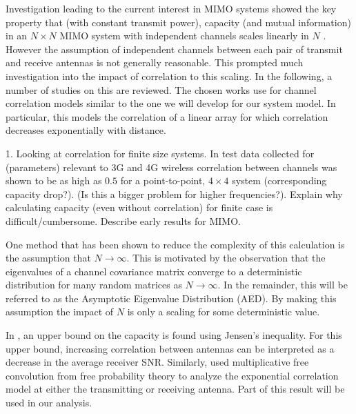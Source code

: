 \par
Investigation leading to the current interest in MIMO systems showed the key property that (with constant transmit power), capacity (and mutual information) in an $N \times N$ MIMO system with independent channels scales linearly in $N$ \cite{foschini1998limits}. However the assumption of independent channels between each pair of transmit and receive antennas is not generally reasonable. This prompted much investigation into the impact of correlation to this scaling. In the following, a number of studies on this are reviewed. The chosen works use for channel correlation models similar to the one we will develop for our system model. In particular, this models the correlation of a linear array for which correlation decreases exponentially with distance.
\par
1. Looking at correlation for finite size systems.
In test data collected for (parameters) relevant to 3G and 4G wireless correlation between channels was shown to be as high as $0.5$ for a point-to-point, $4 \times 4$ system \cite{martin2000multiple} (corresponding capacity drop?). (Is this a bigger problem for higher frequencies?).
Explain why calculating capacity (even without correlation) for finite case is difficult/cumbersome. Describe early results for MIMO.
\par
One method that has been shown to reduce the complexity of this calculation is the assumption that $N \rightarrow \infty$. 
This is motivated by the observation that the eigenvalues of a channel covariance matrix converge to a deterministic distribution for many random 
matrices as  $N \rightarrow \infty$. In the remainder, this will be referred to as the Asymptotic Eigenvalue Distribution (AED). 
By making this assumption the impact of $N$ is only a scaling for some deterministic value. 
\par
In \cite{loyka2001channel}, an upper bound on the capacity is found using Jensen's inequality. For this upper bound, increasing correlation between antennas can be interpreted as a decrease in the average receiver SNR. 
Similarly, \cite{skupch2005free} used multiplicative free convolution from free probability theory to analyze the exponential correlation model at either the transmitting or receiving antenna. Part of this result will be used in our analysis. 

